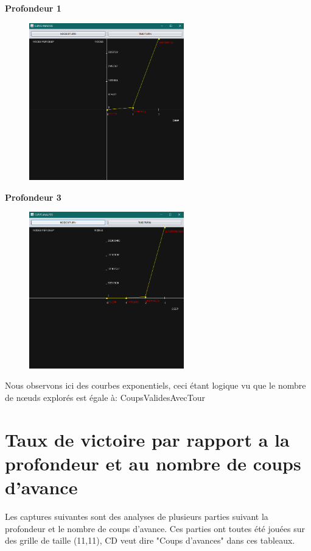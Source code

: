 \centering \textbf{Profondeur 1}
\begin{figure}[!ht]
\begin{center}
\includegraphics[width=0.60\textwidth]{./NODESPERDEEP2}
\end{center}
\end{figure}
\newpage

\centering \textbf{Profondeur 3}
\begin{figure}[!ht]
\begin{center}
\includegraphics[width=0.60\textwidth]{./NODESPERDEEP3}
\end{center}
\end{figure}

Nous observons ici des courbes exponentiels, ceci étant logique vu que le nombre de nœuds explorés
est égale à: CoupsValidesAvecTour 
\newpage


\section{Taux de victoire par rapport a la profondeur et au nombre de coups d'avance}
Les captures suivantes sont des analyses de plusieurs parties suivant la profondeur et le nombre
de coups d'avance.
Ces parties ont toutes été jouées sur des grille de taille (11,11), CD veut dire "Coups d'avances" dans
ces tableaux.

